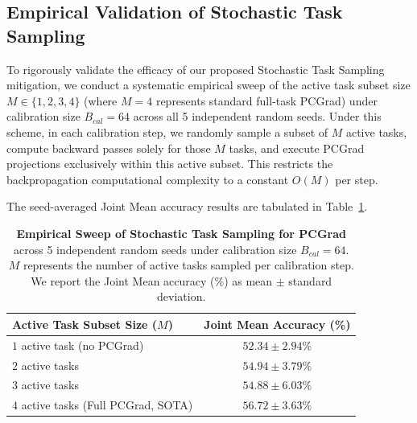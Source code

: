 \subsection{Empirical Validation of Stochastic Task Sampling}
To rigorously validate the efficacy of our proposed Stochastic Task Sampling mitigation, we conduct
a systematic empirical sweep of the active task subset size $M \in \{1, 2, 3, 4\}$ (where $M=4$
represents standard full-task PCGrad) under calibration size $B_{cal}=64$ across all 5 independent
random seeds. Under this scheme, in each calibration step, we randomly sample a subset of $M$ active
tasks, compute backward passes solely for those $M$ tasks, and execute PCGrad projections
exclusively within this active subset. This restricts the backpropagation computational complexity
to a constant $O(M)$ per step.

The seed-averaged Joint Mean accuracy results are tabulated in
Table~\ref{tab:stochastic_pcgrad_sweep}.

\begin{table}[h]
\caption{\textbf{Empirical Sweep of Stochastic Task Sampling for PCGrad} across 5 independent random seeds under calibration size $B_{cal}=64$. $M$ represents the number of active tasks sampled per calibration step. We report the Joint Mean accuracy (\%) as mean $\pm$ standard deviation.}
\label{tab:stochastic_pcgrad_sweep}
\vskip 0.15in
\begin{center}
\begin{small}
\begin{sc}
\begin{tabular}{lc}
\toprule
Active Task Subset Size ($M$) & Joint Mean Accuracy (\%) \\
\midrule
$1$ active task (no PCGrad) & $52.34 \pm 2.94\%$ \\
$2$ active tasks & $54.94 \pm 3.79\%$ \\
$3$ active tasks & $54.88 \pm 6.03\%$ \\
$4$ active tasks (Full PCGrad, SOTA) & $\mathbf{56.72 \pm 3.63\%}$ \\
\bottomrule
\end{tabular}
\end{sc}
\end{small}
\end{center}
\vskip -0.1in
\end{table}

